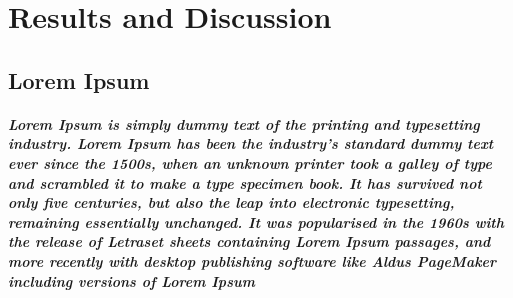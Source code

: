 \chapter{Results and Discussion}	
\label{apendix}

\section{Lorem Ipsum}

\paragraph{
Lorem Ipsum is simply dummy text of the printing and typesetting industry. Lorem Ipsum has been the industry's standard dummy text ever since the 1500s, when an unknown printer took a galley of type and scrambled it to make a type specimen book. It has survived not only five centuries, but also the leap into electronic typesetting, remaining essentially unchanged. It was popularised in the 1960s with the release of Letraset sheets containing Lorem Ipsum passages, and more recently with desktop publishing software like Aldus PageMaker including versions of Lorem Ipsum
}

\paragraph{
\lipsum[1] %
}


\section{\lipsum[1][1]}

\paragraph{
\lipsum[1] %
}



\subsection{\lipsum[1][1]}

\subparagraph{
\lipsum[1] %
}


\subsection{\lipsum[1][1]}

